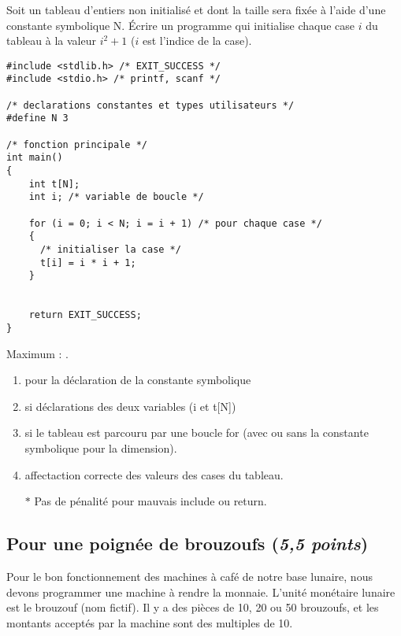 \question Soit un tableau d'entiers non initialisé et dont la taille sera fixée
à l'aide d'une constante symbolique N.  Écrire un programme qui initialise
chaque case $i$ du tableau à la valeur $i^2 + 1$ ($i$ est l'indice de
la case).

\begin{correction}
\begin{small}
\begin{verbatim}
#include <stdlib.h> /* EXIT_SUCCESS */
#include <stdio.h> /* printf, scanf */

/* declarations constantes et types utilisateurs */
#define N 3

/* fonction principale */
int main()
{
    int t[N];
    int i; /* variable de boucle */

    for (i = 0; i < N; i = i + 1) /* pour chaque case */
    {
      /* initialiser la case */
      t[i] = i * i + 1;
    }


    return EXIT_SUCCESS;
}
\end{verbatim}
\end{small} 
  
\end{correction}
\begin{baremeenv}
Maximum : .
  \begin{enumerate}[ (a)]
  \item {} pour la déclaration de la constante symbolique
  \item {} si déclarations des deux variables (i et t[N]) 
    \item {} si le tableau est parcouru par une boucle for
      (avec ou sans la constante symbolique pour la dimension).
    \item {} affectaction correcte des valeurs des cases du tableau.
     \item[$\ast$] Pas de pénalité pour mauvais include ou return.
  \end{enumerate}
\end{baremeenv}

\subsection*{Pour une poignée de brouzoufs (\emph{5,5 points})}

Pour le bon fonctionnement des machines à café de notre base lunaire,
nous devons programmer une machine à rendre la monnaie.  L'unité
monétaire lunaire est le brouzouf (nom fictif). Il y a des
pièces de 10, 20 ou 50 brouzoufs, et les montants acceptés par la
machine sont des multiples de 10.

